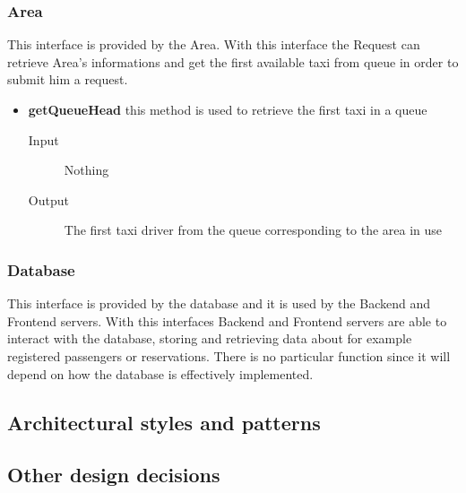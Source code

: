 		\subsubsection{Area} 
		This interface is provided by the Area. With this interface the Request can retrieve Area's informations and get the first available taxi from queue in order to submit him a request.
		\begin{itemize}
			\item \textbf{getQueueHead} this method is used to retrieve the first taxi in a queue
			\begin{description}
				\item[Input] Nothing
				\item[Output] The first taxi driver from the queue corresponding to the area in use
			\end{description}
		\end{itemize}
		\subsubsection{Database} 
		This interface is provided by the database and it is used by the Backend and Frontend servers. With this interfaces Backend and Frontend servers are able to interact with the database, storing and retrieving data about for example registered passengers or reservations. There is no particular function since it will depend on how the database is effectively implemented.
	\subsection{Architectural styles and patterns}
	\subsection{Other design decisions}